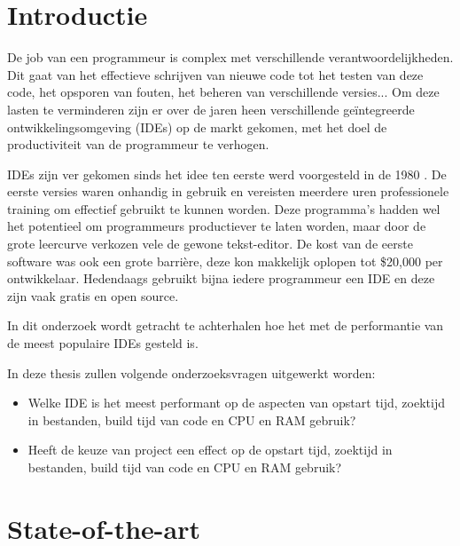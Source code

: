 
\section{Introductie} %
\label{sec:introductie}

De job van een programmeur is complex met verschillende verantwoordelijkheden. Dit gaat van het effectieve schrijven van nieuwe code tot het testen van deze code, het opsporen van fouten, het beheren van verschillende versies... Om deze lasten te verminderen zijn er over de jaren heen verschillende geïntegreerde ontwikkelingsomgeving (IDEs) op de markt gekomen, met het doel de productiviteit van de programmeur te verhogen. 

IDEs zijn ver gekomen sinds het idee ten eerste werd voorgesteld in de 1980 \autocite{Kline2005}. De eerste versies waren onhandig in gebruik en vereisten meerdere uren professionele training om effectief gebruikt te kunnen worden. Deze programma’s hadden wel het potentieel om programmeurs productiever te laten worden, maar door de grote leercurve verkozen vele de gewone tekst-editor. De kost van de eerste software was ook een grote barrière, deze kon makkelijk oplopen tot \$20,000 per ontwikkelaar. Hedendaags gebruikt bijna iedere programmeur een IDE en deze zijn vaak gratis en open source. 
\newpage

In dit onderzoek wordt getracht te achterhalen hoe het met de performantie van de meest populaire IDEs gesteld is. 

In deze thesis zullen volgende onderzoeksvragen uitgewerkt worden:

\begin{itemize}
    \item Welke IDE is het meest performant op de aspecten van opstart tijd, zoektijd in bestanden, build tijd van code en CPU en RAM gebruik?
    \item Heeft de keuze van project een effect op de opstart tijd, zoektijd in bestanden, build tijd van code en CPU en RAM gebruik?
\end{itemize}



\section{State-of-the-art}
\label{sec:state-of-the-art}

